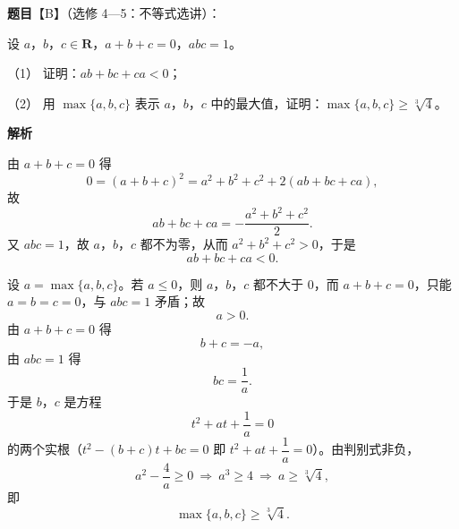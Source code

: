 \begin{answer}

\textbf{题目}【B】（选修 4—5：不等式选讲）：

设 $a$，$b$，$c\in\mathbf R$，$a+b+c=0$，$abc=1$。

（1） 证明：$ab+bc+ca<0$；

（2） 用 $\max\{a,b,c\}$ 表示 $a$，$b$，$c$ 中的最大值，证明：$\max\{a,b,c\}\geqslant\sqrt[3]4$。

\textbf{解析}


由 $a+b+c=0$ 得
\nopagebreak[4]
\[0=(a+b+c)^2=a^2+b^2+c^2+2(ab+bc+ca),\]
故
\nopagebreak[4]
\[ab+bc+ca=-\frac{a^2+b^2+c^2}2 .\]
又 $abc=1$，故 $a$，$b$，$c$ 都不为零，从而 $a^2+b^2+c^2>0$，于是
\nopagebreak[4]
\[ab+bc+ca<0 .\]


设 $a=\max\{a,b,c\}$。若 $a\leqslant0$，则 $a$，$b$，$c$ 都不大于 $0$，而 $a+b+c=0$，只能 $a=b=c=0$，与 $abc=1$ 矛盾；故
\nopagebreak[4]
\[a>0 .\]
由 $a+b+c=0$ 得
\nopagebreak[4]
\[b+c=-a,\]
由 $abc=1$ 得
\nopagebreak[4]
\[bc=\frac1a .\]
于是 $b$，$c$ 是方程
\nopagebreak[4]
\[t^2+at+\frac1a=0\]
的两个实根（$t^2-(b+c)t+bc=0$ 即 $t^2+at+\dfrac1a=0$）。由判别式非负，
\nopagebreak[4]
\[a^2-\frac4a\geqslant0\ \Longrightarrow\ a^3\geqslant4\ \Longrightarrow\ a\geqslant\sqrt[3]{4},\]
即
\nopagebreak[4]
\[\max\{a,b,c\}\geqslant\sqrt[3]{4} .\]



\end{answer}